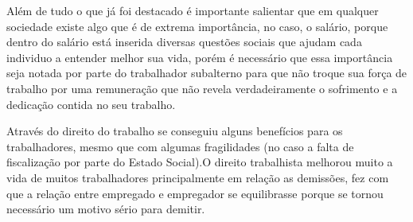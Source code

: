 Além de tudo o que já foi destacado é importante salientar que em qualquer sociedade existe algo que é de extrema importância, no caso, o salário, porque dentro do salário está inserida diversas questões sociais que ajudam cada individuo a entender melhor sua vida, porém é necessário que essa importância seja notada por parte do trabalhador subalterno para que não troque sua força de trabalho por uma remuneração que não revela verdadeiramente o sofrimento e a dedicação contida no seu trabalho.

Através do direito do trabalho se conseguiu alguns benefícios para os trabalhadores, mesmo que com algumas fragilidades (no caso a falta de fiscalização por parte do Estado Social).O direito trabalhista melhorou muito a vida de muitos trabalhadores principalmente em relação as demissões, fez com que a relação entre empregado e empregador se equilibrasse porque se tornou necessário um motivo sério para demitir.

